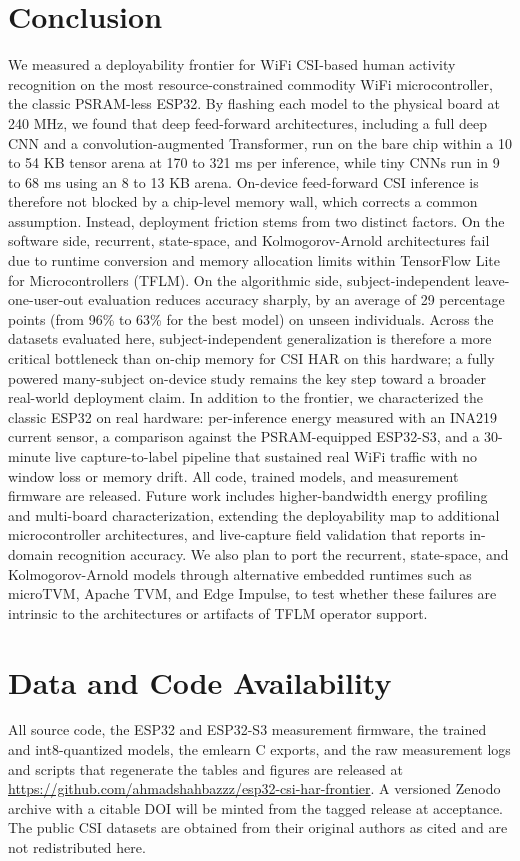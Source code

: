 \documentclass{ieeeaccess}
\begin{document}
\section{Conclusion}
We measured a deployability frontier for WiFi CSI-based human activity recognition on the most resource-constrained commodity WiFi microcontroller, the classic PSRAM-less ESP32. By flashing each model to the physical board at 240 MHz, we found that deep feed-forward architectures, including a full deep CNN and a convolution-augmented Transformer, run on the bare chip within a 10 to 54 KB tensor arena at 170 to 321 ms per inference, while tiny CNNs run in 9 to 68 ms using an 8 to 13 KB arena. On-device feed-forward CSI inference is therefore not blocked by a chip-level memory wall, which corrects a common assumption.
Instead, deployment friction stems from two distinct factors. On the software side, recurrent, state-space, and Kolmogorov-Arnold architectures fail due to runtime conversion and memory allocation limits within TensorFlow Lite for Microcontrollers (TFLM). On the algorithmic side, subject-independent leave-one-user-out evaluation reduces accuracy sharply, by an average of 29 percentage points (from 96\% to 63\% for the best model) on unseen individuals. Across the datasets evaluated here, subject-independent generalization is therefore a more critical bottleneck than on-chip memory for CSI HAR on this hardware; a fully powered many-subject on-device study remains the key step toward a broader real-world deployment claim.
In addition to the frontier, we characterized the classic ESP32 on real hardware: per-inference energy measured with an INA219 current sensor, a comparison against the PSRAM-equipped ESP32-S3, and a 30-minute live capture-to-label pipeline that sustained real WiFi traffic with no window loss or memory drift. All code, trained models, and measurement firmware are released. Future work includes higher-bandwidth energy profiling and multi-board characterization, extending the deployability map to additional microcontroller architectures, and live-capture field validation that reports in-domain recognition accuracy. We also plan to port the recurrent, state-space, and Kolmogorov-Arnold models through alternative embedded runtimes such as microTVM, Apache TVM, and Edge Impulse, to test whether these failures are intrinsic to the architectures or artifacts of TFLM operator support.

\section*{Data and Code Availability}
All source code, the ESP32 and ESP32-S3 measurement firmware, the trained and int8-quantized models, the emlearn C exports, and the raw measurement logs and scripts that regenerate the tables and figures are released at \url{https://github.com/ahmadshahbazzz/esp32-csi-har-frontier}. A versioned Zenodo archive with a citable DOI will be minted from the tagged release at acceptance. The public CSI datasets are obtained from their original authors as cited and are not redistributed here.
\end{document}
